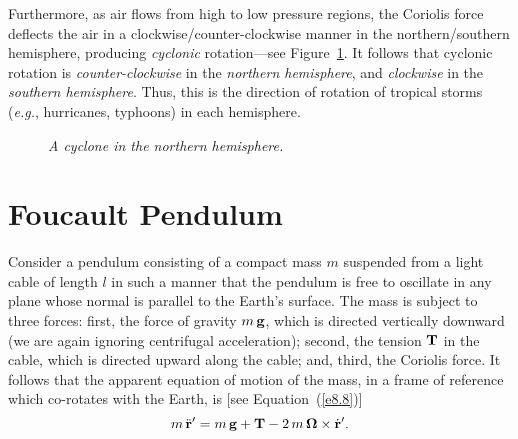 Furthermore, as air flows from high to low pressure regions,
the Coriolis force deflects the air in a clockwise/counter-clockwise manner in the northern/southern
hemisphere, producing {\em cyclonic}\/  rotation---see Figure~\ref{cyc}. 
It follows that cyclonic rotation is {\em counter-clockwise}\/ in the {\em northern hemisphere},
and {\em clockwise}\/ in the {\em southern hemisphere}.  Thus, this
is the direction of rotation of tropical storms ({\em e.g.}, hurricanes,
typhoons) in each hemisphere.

\begin{figure}
\centerline{}
\caption{\em A cyclone in the northern hemisphere.}\label{cyc}
\end{figure}

\section{Foucault Pendulum}
Consider a pendulum consisting of a compact mass $m$ suspended from a light cable of length $l$ in such
a manner that the pendulum is free to oscillate in any plane whose
normal is parallel to the Earth's surface. The mass is
subject to three forces: first, the force of gravity $m\,{\bf g}$, which
is directed vertically downward (we are again ignoring centrifugal
acceleration); second, the tension ${\bf T}$ in the cable, which is directed upward
along the cable; and, third,  the Coriolis force. It follows that the
apparent equation of motion of the mass, in a frame of
reference which co-rotates with the Earth, is [see Equation~(\ref{e8.8})]
\begin{equation}
m\,\ddot{\bf r}' = m\,{\bf g} + {\bf T} - 2\,m\,\mbox{\boldmath$\Omega$}\times \dot{\bf r}'.
\end{equation}

